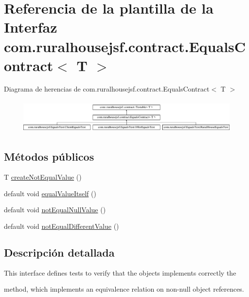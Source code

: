 \hypertarget{interfacecom_1_1ruralhousejsf_1_1contract_1_1_equals_contract}{}\section{Referencia de la plantilla de la Interfaz com.\+ruralhousejsf.\+contract.\+Equals\+Contract$<$ T $>$}
\label{interfacecom_1_1ruralhousejsf_1_1contract_1_1_equals_contract}
Diagrama de herencias de com.\+ruralhousejsf.\+contract.\+Equals\+Contract$<$ T $>$\begin{figure}[H]
\begin{center}
\leavevmode
\includegraphics[height=1.777778cm]{d7/d3c/interfacecom_1_1ruralhousejsf_1_1contract_1_1_equals_contract}
\end{center}
\end{figure}
\subsection*{Métodos públicos}
\begin{DoxyCompactItemize}
\item 
T \mbox{\hyperlink{interfacecom_1_1ruralhousejsf_1_1contract_1_1_equals_contract_a65840509b57f6b89e42e2abf1978aa01}{create\+Not\+Equal\+Value}} ()
\item 
default void \mbox{\hyperlink{interfacecom_1_1ruralhousejsf_1_1contract_1_1_equals_contract_a5daf9e73e1147c8765c0fcf3d3dddbb0}{equal\+Value\+Itself}} ()
\item 
default void \mbox{\hyperlink{interfacecom_1_1ruralhousejsf_1_1contract_1_1_equals_contract_adda6a50dc1babeb3783fd92a09aac788}{not\+Equal\+Null\+Value}} ()
\item 
default void \mbox{\hyperlink{interfacecom_1_1ruralhousejsf_1_1contract_1_1_equals_contract_acaa5c1c071bf63a3e629977c73131fc8}{not\+Equal\+Different\+Value}} ()
\end{DoxyCompactItemize}


\subsection{Descripción detallada}
This interface defines tests to verify that the objects implements correctly the
\begin{DoxyCode}{0}
\end{DoxyCode}
 method, which implements an equivalence relation on non-\/null object references. 


